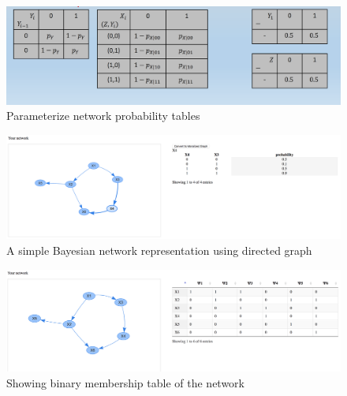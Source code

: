 \documentclass{article}
\begin{document}
\begin{enumerate}
        \begin{figure}[hb!]
            \includegraphics[width=\textwidth]{img/parameterize_network_description.png}
            \centering
            \caption{Parameterize network probability tables}
            \label{fig:parameterize_network_description}
        \end{figure}
    \end{enumerate}

    \begin{figure}[hb!]
        \includegraphics[width=\textwidth]{img/network_one_highlighted.png}
        \centering
        \caption{A simple Bayesian network representation using directed graph}
        \label{fig:besian_network}
    \end{figure}

    \begin{figure}[hb!]
        \includegraphics[width=\linewidth]{img/network_binary_matrix.png}
        \caption{Showing binary membership table of the network}
        \label{fig:binary_membership}
    \end{figure}
\end{document}
